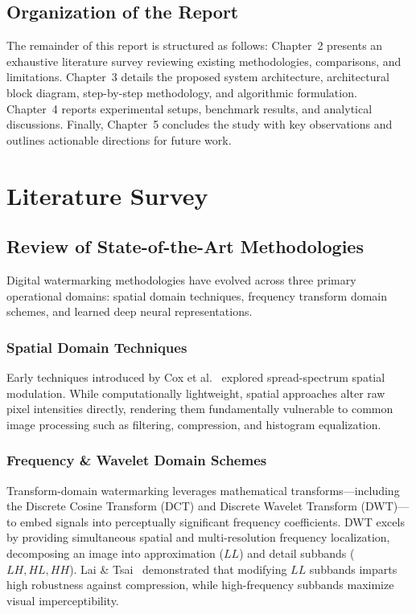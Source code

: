 \documentclass[12pt,a4paper]{report}
\begin{document}
\section{Organization of the Report}
The remainder of this report is structured as follows: Chapter~2 presents an exhaustive literature survey reviewing existing methodologies, comparisons, and limitations. Chapter~3 details the proposed system architecture, architectural block diagram, step-by-step methodology, and algorithmic formulation. Chapter~4 reports experimental setups, benchmark results, and analytical discussions. Finally, Chapter~5 concludes the study with key observations and outlines actionable directions for future work.

\chapter{Literature Survey}

\section{Review of State-of-the-Art Methodologies}
Digital watermarking methodologies have evolved across three primary operational domains: spatial domain techniques, frequency transform domain schemes, and learned deep neural representations.

\subsection{Spatial Domain Techniques}
Early techniques introduced by Cox et al.~\cite{cox2002digital} explored spread-spectrum spatial modulation. While computationally lightweight, spatial approaches alter raw pixel intensities directly, rendering them fundamentally vulnerable to common image processing such as filtering, compression, and histogram equalization.

\subsection{Frequency \& Wavelet Domain Schemes}
Transform-domain watermarking leverages mathematical transforms---including the Discrete Cosine Transform (DCT) and Discrete Wavelet Transform (DWT)---to embed signals into perceptually significant frequency coefficients. DWT excels by providing simultaneous spatial and multi-resolution frequency localization, decomposing an image into approximation ($LL$) and detail subbands ($LH, HL, HH$). Lai \& Tsai~\cite{lai2010digital} demonstrated that modifying $LL$ subbands imparts high robustness against compression, while high-frequency subbands maximize visual imperceptibility.
\end{document}
